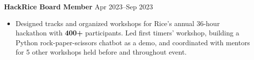 \textbf{HackRice Board Member} \hfill Apr 2023--Sep 2023

\begin{itemize}
	\item Designed tracks and organized workshops for Rice's annual 36-hour hackathon with \textbf{400+} participants. Led first timers' workshop, building a Python rock-paper-scissors chatbot as a demo, and coordinated with mentors for 5 other workshops held before and throughout event.
\end{itemize}\par